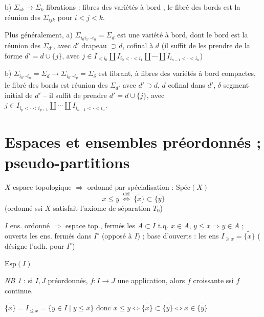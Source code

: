 \documentclass[11pt,a4paper]{article}
\begin{document}
b) $\Sigma_{ik}\to\Sigma_k$ fibrations : fibres des variétés à bord , le fibré des bords est la réunion des $\Sigma_{ijk}$ pour $i<j<k$.

Plus généralement, a) $\Sigma_{i_0 i_1\cdots i_n}=\Sigma_d$ est une variété à bord, dont le bord est la réunion des $\Sigma_{d'}$, avec $d'$ drapeau $\supset d$, cofinal à $d$ (il suffit de les prendre de la forme $d'=d\cup\lbrace j\rbrace$, avec $j\in I_{<i_0}\amalg I_{i_0<\cdot<i_1}\amalg\cdots\amalg I_{i_{n-1}<\cdot<i_n}$)

b) $\Sigma_{i_0\cdots i_n}=\Sigma_d\longrightarrow\Sigma_{i_0\cdots i_p}=\Sigma_\delta$ est fibrant, à fibres des variétés à bord compactes, le fibré des bords est réunion des $\Sigma_{d'}$ avec $d'\supset d$, $d$ cofinal dans $d'$, $\delta$ segment initial de $d'$ -- il suffit de prendre $d'=d\cup\lbrace j\rbrace$, avec $j\in I_{i_p<\cdot<i_{p+1}}\amalg\cdots\amalg I_{i_{n-1}<\cdot<i_n}$.

\section*{Espaces et ensembles préordonnés ; pseudo-partitions}


$X$ espace topologique $\Rightarrow$ ordonné par spécialisation : $\mathrm{Spéc}(X)$
\[
x\le y\ \overset{\text{déf}}{\Longleftrightarrow}\ \overline{\lbrace x\rbrace}\subset\overline{\lbrace y\rbrace}
\]
(ordonné ssi $X$ satisfait l'axiome de séparation $T_0$)

$I$ ens. ordonné $\Rightarrow$ espace top., fermés les $A\subset I$ t.q. $x\in A$, $y\le x\Rightarrow y\in A$ ; ouverts les ens. fermés dans $I^{\circ}$ (opposé à $I$) ; base d'ouverts : les ens $I_{\ge x}=\widetilde{\lbrace x\rbrace}$ ( désigne l'adh. pour $I^{\circ}$)

$\mathrm{Esp}(I)$ \qquad {}

\emph{NB 1} : si $I,J$ préordonnés, $f:I\to J$ une application, alors $f$ croissante ssi $f$ continue.

$\overline{\lbrace x\rbrace}=I_{\le x}=\lbrace y\in I\mid y\le x\rbrace$ donc $x\le y\Longleftrightarrow\overline{\lbrace x\rbrace}\subset\overline{\lbrace y\rbrace}\Longleftrightarrow x\in\overline{\lbrace y\rbrace}$
\end{document}
